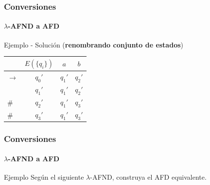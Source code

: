 \documentclass{beamer}
\begin{document}
        \begin{frame}
			\frametitle{Conversiones}
			\framesubtitle{$\lambda$-AFND a AFD}

            \begin{exampleblock}{Ejemplo - Soluci\'on (\textbf{renombrando conjunto de estados})}
               \begin{table}
                   \begin{center}
                       \begin{tabular}{lc|c|c} 
                           & $E(\{q_{i}\})$ & $a$ & $b$ \\ \hline
                           $\rightarrow$ & $q_{0}'$ & $q_{1}'$ & $q_{2}'$ \\
                           & $q_{1}'$ & $q_{1}'$ & $q_{2}'$ \\
                           \# & $q_{2}'$ & $q_{1}'$ & $q_{3}'$ \\
                           \# & $q_{3}'$ & $q_{1}'$ & $q_{3}'$ \\
                       \end{tabular}
                   \end{center}
               \end{table}
            \end{exampleblock}
		\end{frame}		

        \begin{frame}
			\frametitle{Conversiones}
			\framesubtitle{$\lambda$-AFND a AFD}

            \begin{exampleblock}{Ejemplo}
               Seg\'un el siguiente $\lambda$-AFND, construya el AFD equivalente.
               \begin{center}
			   \end{center}
            \end{exampleblock}
		\end{frame}	
\end{document}

